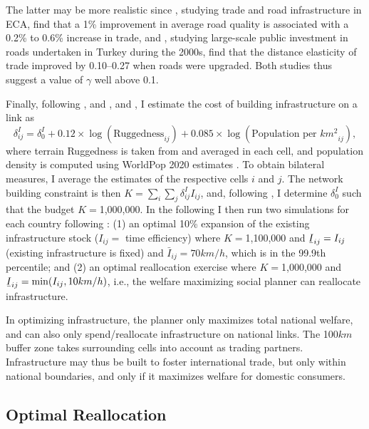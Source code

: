 \documentclass[a4paper]{article}
\newcommand{\ubar}[1]{\text{\b{$#1$}}}
\begin{document}
The latter may be more realistic since \citet{shepherd2007trade}, studying trade and road infrastructure in ECA, find that a 1\% improvement in average road quality is associated with a 0.2\% to 0.6\% increase in trade, and \citet{cocsar2016domestic}, studying large-scale public investment in roads undertaken in Turkey during the 2000s, find that the distance elasticity of trade improved by 0.10–0.27 when roads were upgraded. Both studies thus suggest a value of $\gamma$ well above 0.1. \newline 

Finally, following \citet{fajgelbaum2020optimal}, and \citet{collier2016cost}, and \citet{krantz2024optimal}, I estimate the cost of building infrastructure on a link as 
\begin{equation}
\delta^I_{ij} = \delta^I_0 + 0.12 \times \log(\text{Ruggedness}_{ij}) + 0.085 \times \log(\text{Population per $km^2$}_{ij}),
\end{equation}
where terrain Ruggedness is taken from \citet{nunn2012ruggedness} and averaged in each cell, and population density is computed using WorldPop 2020 estimates \citep{tatem2017worldpop}. To obtain bilateral measures, I average the estimates of the respective cells $i$ and $j$. The network building constraint is then $K = \sum_i \sum_j \delta^I_{ij} I_{ij}$, and, following \citet{fajgelbaum2020optimal}, I determine $\delta^I_0$ such that the budget $K = $1,000,000. In the following I then run two simulations for each country following \citet{graff2024spatial}: (1) an optimal 10\% expansion of the existing infrastructure stock ($I_{ij} = $ time efficiency) where $K = $1,100,000 and $\ubar{I}_{ij} = I_{ij}$ (existing infrastructure is fixed) and $\bar{I}_{ij} = 70km/h$, which is in the 99.9th percentile; and (2) an optimal reallocation exercise where $K = $1,000,000 and $\ubar{I}_{ij} = \min(I_{ij}, 10km/h)$, i.e., the welfare maximizing social planner can reallocate infrastructure. \newline 

In optimizing infrastructure, the planner only maximizes total national welfare, and can also only spend/reallocate infrastructure on national links. The 100$km$ buffer zone takes surrounding cells into account as trading partners. Infrastructure may thus be built to foster international trade, but only within national boundaries, and only if it maximizes welfare for domestic consumers. %

\subsection*{Optimal Reallocation}
 
\end{document}
